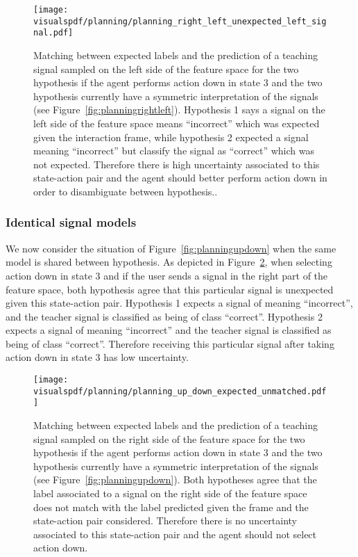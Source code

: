 \begin{figure}[H]
  \centering
  \texttt{[image: \\visualspdf/planning/planning\_right\_left\_unexpected\_left\_signal.pdf]}
  \caption{Matching between expected labels and the prediction of a teaching signal sampled on the left side of the feature space for the two hypothesis if the agent performs action down in state 3 and the two hypothesis currently have a symmetric interpretation of the signals (see Figure~\ref{fig:planningrightleft}). Hypothesis 1 says a signal on the left side of the feature space means ``incorrect'' which was expected given the interaction frame, while hypothesis 2 expected a signal meaning ``incorrect'' but classify the signal as ``correct'' which was not expected. Therefore there is high uncertainty associated to this state-action pair and the agent should better perform action down in order to disambiguate between hypothesis..}
  \label{fig:uncertaintymeaningrightleftunexpectedleft}
\end{figure}

\newpage

\subsubsection*{Identical signal models}

We now consider the situation of Figure~\ref{fig:planningupdown} when the same model is shared between hypothesis. As depicted in Figure~\ref{fig:uncertaintymeaningupdownexpectedright}, when selecting action down in state 3 and if the user sends a signal in the right part of the feature space, both hypothesis agree that this particular signal is unexpected given this state-action pair. Hypothesis 1 expects a signal of meaning ``incorrect'', and the teacher signal is classified as being of class ``correct''. Hypothesis 2 expects a signal of meaning ``incorrect'' and the teacher signal is classified as being of class ``correct''. Therefore receiving this particular signal after taking action down in state 3 has low uncertainty.

\begin{figure}[H]
  \centering
  \texttt{[image: \\visualspdf/planning/planning\_up\_down\_expected\_unmatched.pdf]}
  \caption{Matching between expected labels and the prediction of a teaching signal sampled on the right side of the feature space for the two hypothesis if the agent performs action down in state 3 and the two hypothesis currently have a symmetric interpretation of the signals (see Figure~\ref{fig:planningupdown}). Both hypotheses agree that the label associated to a signal on the right side of the feature space does not match with the label predicted given the frame and the state-action pair considered. Therefore there is no uncertainty associated to this state-action pair and the agent should not select action down.}
  \label{fig:uncertaintymeaningupdownexpectedright}
\end{figure}

